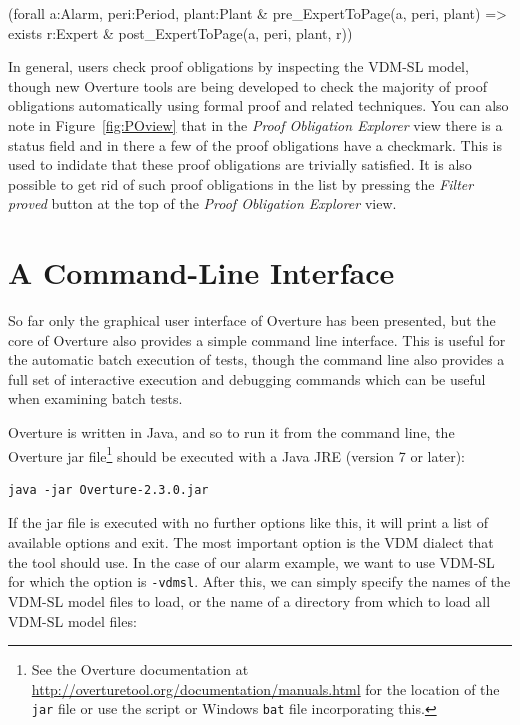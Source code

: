 \begin{vdmsl}
(forall a:Alarm, peri:Period, plant:Plant &
    pre_ExpertToPage(a, peri, plant) => 
    exists r:Expert & post_ExpertToPage(a, peri, plant, r))
\end{vdmsl}

In general, users check proof obligations by inspecting the VDM-SL model, though new Overture tools are being developed to check the majority of proof obligations automatically using formal proof and related
techniques. You can also note in Figure~\ref{fig:POview} that in the \emph{Proof Obligation Explorer} view there is a status field and in there a few of the proof obligations have a checkmark. This is used to indidate that these proof obligations are trivially satisfied. It is also possible to get rid of such proof obligations in the list by pressing the \emph{Filter proved} button at the top of the \emph{Proof Obligation Explorer} view.
%
\section{A Command-Line Interface}\label{sec:cmdline}
So far only the graphical user interface of Overture has been presented, but the core of Overture also
provides a simple command line interface.  This is useful for the automatic batch execution of tests, though the command line also provides a full set of interactive execution and debugging commands which can be useful when examining batch tests. 

Overture is written in Java, and so to run it from the command line, the Overture jar file\footnote{See the Overture documentation at \url{http://overturetool.org/documentation/manuals.html} for the location of the \texttt{jar} file or use the script or Windows \texttt{bat} file incorporating this.} should be executed with a Java JRE (version 7 or later):

\lstset{style=tool,language=}
\begin{lstlisting}
java -jar Overture-2.3.0.jar
\end{lstlisting}

\noindent If the jar file is executed with no further options like this, it will print a list of available options and exit. The most important option is the VDM dialect that the tool should use. In the
case of our alarm example, we want to use VDM-SL for which the option is \verb|-vdmsl|. After this, we can simply specify the names of the VDM-SL model files to load, or the name of a directory from which to
load all VDM-SL model files:

